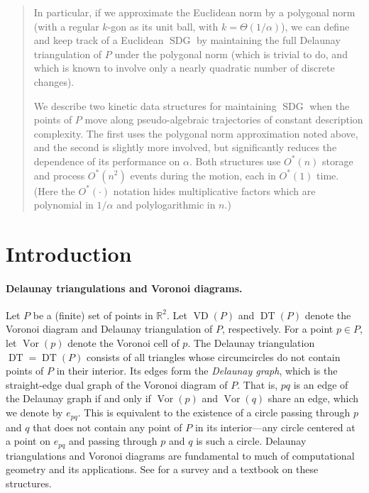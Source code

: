 \documentclass[letter,11pt]{article}
\def \reals{{\mathbb R}}
\def\SDG{\mathop{\mathrm{SDG}}}
\def\DT{\mathop{\mathrm{DT}}}
\def\VD{\mathop{\mathrm{VD}}}
\def\Vor{\mathop{\mathrm{Vor}}}
\begin{document}
\begin{titlepage}
\begin{abstract}
In particular, if we approximate the Euclidean norm by a polygonal 
norm (with a regular $k$-gon as its unit ball, with
$k=\Theta(1/\alpha)$), we can define and keep track of a Euclidean $\SDG$
by maintaining the full Delaunay triangulation of $P$ under the
polygonal norm (which is trivial to do, and which is known to involve only a
nearly quadratic number of discrete changes).

We describe two kinetic data structures for maintaining $\SDG$ when
the points of $P$ move along pseudo-algebraic trajectories of constant description complexity. The first
uses the polygonal norm approximation noted above, and the second is
slightly more involved, but significantly reduces the dependence of 
its performance on $\alpha$.  Both structures use $O^*(n)$ storage 
and process $O^*(n^2)$ events during the motion, each in $O^*(1)$ time.
(Here the $O^*(\cdot)$ notation hides multiplicative factors which 
are polynomial in $1/\alpha$ and polylogarithmic in $n$.)
\end{abstract}

\end{titlepage}

\section{Introduction}


\paragraph{Delaunay triangulations and Voronoi diagrams.} 
Let $P$ be a (finite) set of points in $\reals^2$. 
Let $\VD(P)$ and $\DT(P)$ denote the Voronoi diagram and Delaunay
triangulation of $P$, respectively. For a point $p \in P$, let
$\Vor(p)$ denote the Voronoi cell of $p$. 
The Delaunay triangulation $\DT=\DT(P)$ consists of all 
triangles whose circumcircles do not contain points of $P$ in their
interior. Its edges form the {\em Delaunay graph}, which is the 
straight-edge dual graph of the Voronoi diagram of $P$. That is,
$pq$ is an edge of the Delaunay graph if and only if
$\Vor(p)$ and $\Vor(q)$ share an edge, which we denote by $e_{pq}$.
This is equivalent to the existence of a circle passing through $p$
and $q$ that does not contain any point of $P$ in its interior---any
circle centered at a point on $e_{pq}$ and passing through $p$ and $q$
is such a circle. 
Delaunay triangulations and Voronoi diagrams are fundamental to much 
of computational geometry and its applications. 
See \cite{AK,Ed2} for a survey and a
textbook on these structures.
\end{document}
